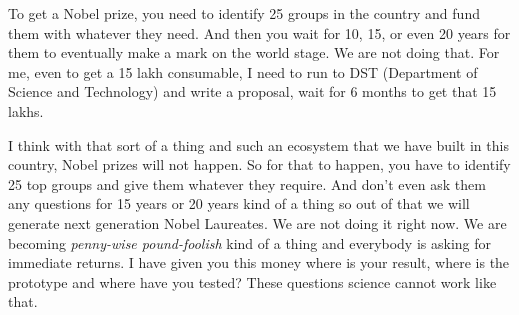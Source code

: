\begin{multicols}{2}
To get a Nobel prize, you need to identify 25 groups in the country and fund them with whatever they need. And then you wait for 10, 15, or even 20 years for them to eventually make a mark on the world stage. We are not doing that. For me, even to get a 15 lakh consumable, I need to run to DST (Department of Science and Technology) and write a proposal, wait for 6 months to get that 15 lakhs.

I think with that sort of a thing and such an ecosystem that we have built in this country, Nobel prizes will not happen. So for that to happen, you have to identify 25 top groups and give them whatever they require. And don’t even ask them any questions for 15 years or 20 years kind of a thing so out of that we will generate next generation Nobel Laureates. We are not doing it right now. We are becoming \textit{penny-wise pound-foolish} kind of a thing and everybody is asking for immediate returns. I have given you this money where is your result, where is the prototype and where have you tested? These questions science cannot work like that.\hfill {}
\end{multicols}
